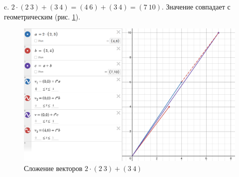 \documentclass[14pt,a4paper]{extarticle}
\begin{document}
\FloatBarrier
c. $2 \cdot (2 \ 3) + (3 \ 4) = (4 \ 6)+(3 \ 4)=(7 \ 10)$. Значение совпадает с геометрическим (рис. \ref{pic:c}).
\begin{figure}[h!]
    \centering
    \includegraphics[scale=0.5]{pic7/5.c.png}
    \caption{Сложение векторов $2 \cdot (2 \ 3) + (3 \ 4)$}
    \label{pic:c}
\end{figure}
\FloatBarrier
\end{document}
